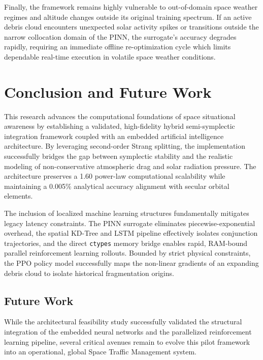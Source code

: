 \documentclass[letterpaper, preprint, 11pt]{AAS}
\begin{document}
Finally, the framework remains highly vulnerable to out-of-domain space weather regimes and altitude changes outside its original training spectrum. If an active debris cloud encounters unexpected solar activity spikes or transitions outside the narrow collocation domain of the PINN, the surrogate's accuracy degrades rapidly, requiring an immediate offline re-optimization cycle which limits dependable real-time execution in volatile space weather conditions.

\section{Conclusion and Future Work}

This research advances the computational foundations of space situational awareness by establishing a validated, high-fidelity hybrid semi-symplectic integration framework coupled with an embedded artificial intelligence architecture. By leveraging second-order Strang splitting, the implementation successfully bridges the gap between symplectic stability and the realistic modeling of non-conservative atmospheric drag and solar radiation pressure. The architecture preserves a 1.60 power-law computational scalability while maintaining a 0.005\% analytical accuracy alignment with secular orbital elements.

The inclusion of localized machine learning structures fundamentally mitigates legacy latency constraints. The PINN surrogate eliminates piecewise-exponential overhead, the spatial KD-Tree and LSTM pipeline effectively isolates conjunction trajectories, and the direct \texttt{ctypes} memory bridge enables rapid, RAM-bound parallel reinforcement learning rollouts. Bounded by strict physical constraints, the PPO policy model successfully maps the non-linear gradients of an expanding debris cloud to isolate historical fragmentation origins.

\subsection{Future Work}
While the architectural feasibility study successfully validated the structural integration of the embedded neural networks and the parallelized reinforcement learning pipeline, several critical avenues remain to evolve this pilot framework into an operational, global Space Traffic Management system. 
\end{document}
